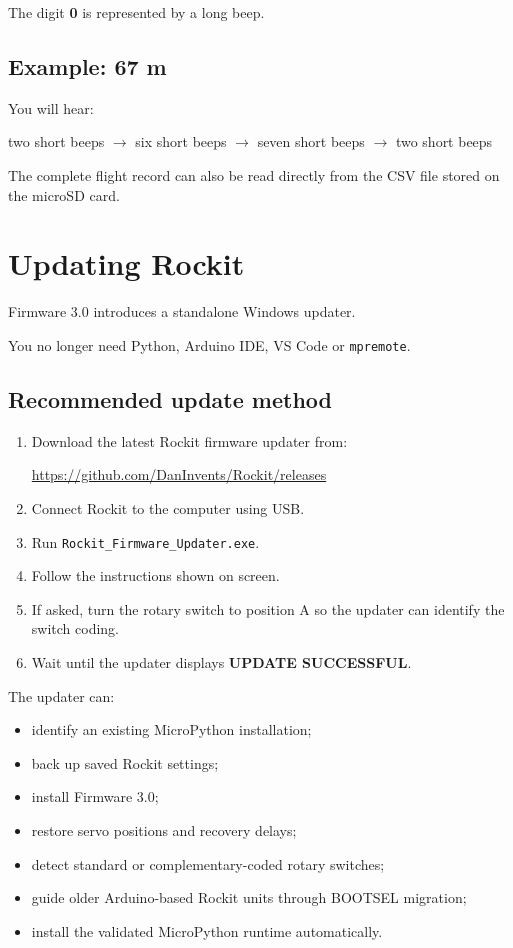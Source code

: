 \documentclass[11pt,a4paper]{article}
\begin{document}
The digit \textbf{0} is represented by a long beep.

\subsection*{Example: 67 m}

You will hear:

\begin{center}
two short beeps $\rightarrow$ six short beeps $\rightarrow$ seven short beeps $\rightarrow$ two short beeps
\end{center}

The complete flight record can also be read directly from the CSV file stored on the microSD card.

\section{Updating Rockit}

Firmware 3.0 introduces a standalone Windows updater.

You no longer need Python, Arduino IDE, VS Code or \texttt{mpremote}.

\subsection{Recommended update method}

\begin{enumerate}
    \item Download the latest Rockit firmware updater from:
    \begin{center}
    \url{https://github.com/DanInvents/Rockit/releases}
    \end{center}
    \item Connect Rockit to the computer using USB.
    \item Run \texttt{Rockit\_Firmware\_Updater.exe}.
    \item Follow the instructions shown on screen.
    \item If asked, turn the rotary switch to position A so the updater can identify the switch coding.
    \item Wait until the updater displays \textbf{UPDATE SUCCESSFUL}.
\end{enumerate}

The updater can:

\begin{itemize}
    \item identify an existing MicroPython installation;
    \item back up saved Rockit settings;
    \item install Firmware 3.0;
    \item restore servo positions and recovery delays;
    \item detect standard or complementary-coded rotary switches;
    \item guide older Arduino-based Rockit units through BOOTSEL migration;
    \item install the validated MicroPython runtime automatically.
\end{itemize}
\end{document}
